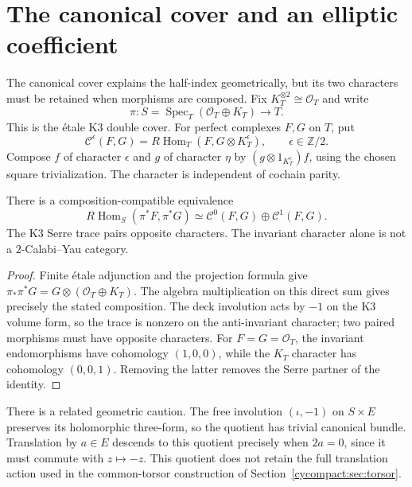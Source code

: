 \section{The canonical cover and an elliptic coefficient}
\label{cyprim:sec:elliptic-coefficient}

The canonical cover explains the half-index geometrically,
but its two characters must be retained when morphisms are
composed. Fix $K_T^{\otimes2}\cong\mathcal O_T$ and write
\[
 \pi:S=\operatorname{Spec}_T(\mathcal O_T\oplus K_T)\longrightarrow T.
\]
This is the \'etale K3 double cover. For perfect complexes
$F,G$ on $T$, put
\[
 \mathcal C^\epsilon(F,G)
 =R\operatorname{Hom}_T(F,G\otimes K_T^\epsilon),
 \qquad \epsilon\in\mathbb Z/2.
\]
Compose $f$ of character $\epsilon$ and $g$ of character
$\eta$ by $(g\otimes1_{K_T^\epsilon})f$, using the chosen
square trivialization. The character is independent of
cochain parity.

\begin{proposition}\label{cyprim:prop:cover}
There is a composition-compatible equivalence
\[
 R\operatorname{Hom}_S(\pi^*F,\pi^*G)
 \simeq\mathcal C^0(F,G)\oplus\mathcal C^1(F,G).
\]
The K3 Serre trace pairs opposite characters. The invariant
character alone is not a $2$-Calabi--Yau category.
\end{proposition}

\begin{proof}
Finite \'etale adjunction and the projection formula give
$\pi_*\pi^*G=G\otimes(\mathcal O_T\oplus K_T)$.
The algebra multiplication on this direct sum gives precisely
the stated composition. The deck involution acts by $-1$
on the K3 volume form, so the trace is nonzero on the
anti-invariant character; two paired morphisms must have
opposite characters. For $F=G=\mathcal O_T$, the invariant
endomorphisms have cohomology $(1,0,0)$, while the $K_T$
character has cohomology $(0,0,1)$. Removing the latter
removes the Serre partner of the identity.
\end{proof}

There is a related geometric caution. The free involution
$(\iota,-1)$ on $S\times E$ preserves its holomorphic
three-form, so the quotient has trivial canonical bundle.
Translation by $a\in E$ descends to this quotient precisely
when $2a=0$, since it must commute with $z\mapsto-z$.
This quotient does not retain the full translation action
used in the common-torsor construction of
Section~\ref{cycompact:sec:torsor}.

